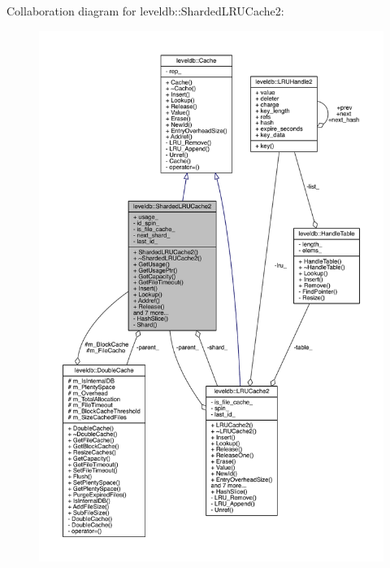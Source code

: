 Collaboration diagram for leveldb\+:\+:Sharded\+L\+R\+U\+Cache2\+:
\nopagebreak
\begin{figure}[H]
\begin{center}
\leavevmode
\includegraphics[width=350pt]{classleveldb_1_1_sharded_l_r_u_cache2__coll__graph}
\end{center}
\end{figure}
